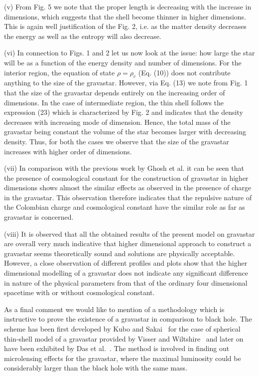 \documentclass[preprint,12pt]{elsarticle}
\begin{document}
(v) From Fig. 5 we note that the proper length is decreasing
with the increase in dimensions, which suggests that the shell become thinner
in higher dimensions.  This is again well justification of the Fig. 2,
i.e. as the matter density decreases the energy as well as the entropy
will also decrease.

(vi) In connection to Figs. 1 and 2 let us now look at the issue: how large the star will be as a function of the energy density and number of dimensions. For the interior region, the equation of state $\rho = \rho_c$ (Eq. (10)) does not contribute anything to the size of the gravastar. However, via Eq. (13) we note from Fig. 1 that the size of the gravastar depends entirely on the increasing order of dimensions. In the case of intermediate region, the thin shell follows the expression (23) which is characterized by Fig. 2 and indicates that the density decreases with increasing mode of dimension. Hence, the total mass of the gravastar being constant the volume of the star becomes larger with decreasing density. Thus, for both the cases we observe that the size of the gravastar increases with higher order of dimensions.

(vii) In comparison with the previous work by Ghosh et al. \cite{Ghosh2017}
it can be seen that the presence of cosmological constant for the construction
of gravastar in higher dimensions shows almost the similar effects as observed in
the presence of charge in the gravastar. This observation therefore indicates that
the repulsive nature of the Colombian charge and cosmological constant have
the similar role as far as gravastar is concerned.

(viii) It is observed that all the obtained results of the present model on gravastar
are overall very much indicative that higher dimensional approach
to construct a gravastar seems theoretically sound and solutions are
physically acceptable. However, a close observation of different profiles and
plots show that the higher dimensional modelling of a gravastar
does not indicate any significant difference in nature of the physical parameters
from that of the ordinary four dimensional spacetime with or without cosmological constant.

As a final comment we would like to mention of a methodology which is instructive to
prove the existence of a gravastar in comparison to black hole. The scheme has been
first developed by Kubo and Sakai~\cite{KS2016} for the case of spherical thin-shell model
of a gravastar provided by Visser and Wiltshire~\cite{VW2004} and later on have been exhibited
by Das et al.~\cite{Das2017}. The method is involved in finding out microlensing effects
for the gravastar, where the maximal luminosity could be considerably larger than
the black hole with the same mass.
\end{document}
